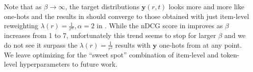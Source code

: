 \documentclass[11pt, a4paper, onecolumn, confidential, copyright, gdm]{google}
\begin{document}
Note that as $\beta \rightarrow \infty$, the target distributions $\mathbf{y}(r,t)$ looks more and more like one-hots and the results in  should converge to those obtained with just item-level reweighting $\lambda(r)=\frac{1}{r^\alpha}, \alpha=2$ in . While the nDCG score in  improves as $\beta$ increases from 1 to 7, unfortunately this trend seems to stop for larger $\beta$ and we do not see it surpass the $\lambda(r)=\frac{1}{r^2}$ results with $\mathbf{y}$ one-hots from  at any point. We leave optimizing for the ``sweet spot'' combination of item-level and token-level hyperparameters to future work.

\end{document}
